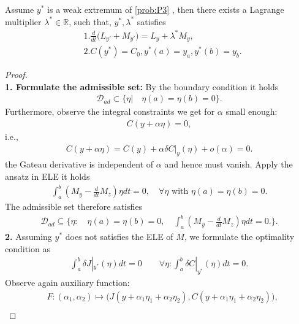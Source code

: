 \begin{theorem}
Assume $y^*$ is a weak extremum of \eqref{prob:P3} , then there exists a Lagrange multiplier $\lambda^* \in \mathbb{R}$, such that,  $y^*, \lambda^* $ satisfies
\begin{equation}
\begin{aligned}
	&1. \frac{d}{dt}\bigg(L_{y'} + M_{y'} \bigg) = L_y+ \lambda^* M_y, \\
	&2.  C(y^*) = C_0, y^*(a) = y_a,  y^*(b) = y_b. 
\end{aligned}
\end{equation}
\end{theorem}
\begin{proof}\quad\\
\textbf{1. Formulate the admissible set:}
	By the boundary condition it holds
	\begin{align*}
		\mathcal{D}_{ad} \subset \{\eta | \quad \eta(a) = \eta(b) = 0\}. 
	\end{align*}
	Furthermore, observe the integral constraints we get for $\alpha$ small enough:
	\begin{align*}
		C(y + \alpha \eta ) = 0, 
	\end{align*}
	i.e., 
	\begin{align*}
		C(y + \alpha \eta) = C(y) + \alpha \delta C|_y(\eta) + o(\alpha) = 0. 
	\end{align*}
	the Gateau derivative is independent of $\alpha$ and hence must vanish. Apply the ansatz in ELE it holds
	\begin{align*}
		\int_a^b (M_y - \frac{d}{dt}M_z) \eta dt = 0, \quad \forall \eta \text{ with } \eta(a) = \eta(b) = 0.  
	\end{align*}
	The admissible set therefore satisfies
	\begin{align*}
		\mathcal{D}_{ad} \subseteq \bigg\{\eta: \quad \eta(a) = \eta(b) = 0, \quad \int_a^b(M_y - \frac{d}{dt}M_z)\eta dt = 0. \bigg\}. 
	\end{align*}
	\textbf{2.} Assuming $y^*$ does not satisfies the ELE of $M$, we formulate the optimality condition as
	\begin{align*}
		\int_a^b \delta J|_{y^*} (\eta) dt = 0 \qquad \forall \eta : \int_a^b \delta C|_{y^*}(\eta) dt = 0. 
	\end{align*} 
	Observe again auxiliary function:
	\begin{align*}
		& F: (\alpha_1, \alpha_2) \mapsto \bigg( J(y + \alpha_1 \eta_1 + \alpha_2 \eta_2), C(y + \alpha_1 \eta_1 + \alpha_2 \eta_2) \bigg), \\

\end{align*}
\end{proof}
